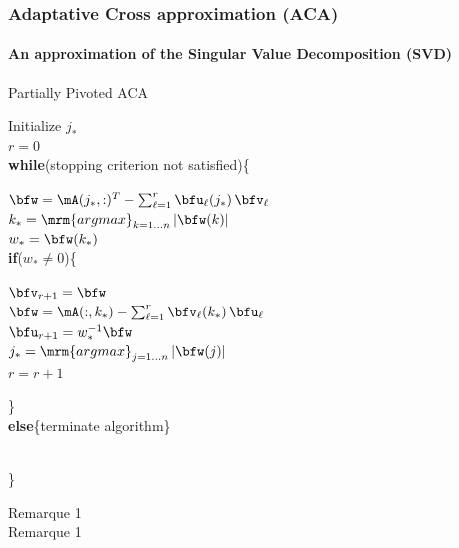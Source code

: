 
\begin{frame}
\frametitle{Adaptative Cross approximation (ACA)}
\framesubtitle{An approximation of the Singular Value Decomposition (SVD)} 

\begin{minipage}[t]{.6\linewidth}
\vspace{-0.9cm}
\begin{algorithm}[H]
  \caption{Partially Pivoted ACA}  
  Initialize $j_{*}$\\ $r=0$\\
  \textbf{while}(stopping criterion not satisfied)\{\\
  \indent\hspace{0.49cm} \parbox{\linewidth}{
    $\bfw = \mA(j_{*},:)^{T} - \sum_{\ell=1}^{r}\bfu_{\ell}(j_{*})\,\bfv_{\ell}$\\
    $k_{*} = \mathop{\mrm{argmax}}_{k = 1\dots n}\vert \bfw(k)\vert$\\
    $w_{*} = \bfw(k_{*})$\\
    \textbf{if}($w_{*}\neq 0$)\{\\
    \indent\hspace{0.5cm} \parbox{\linewidth}{
      $\bfv_{r+1} = \bfw$\\
      $\bfw = \mA(:,k_{*})-\sum_{\ell = 1}^{r}\bfv_{\ell}(k_{*})\,\bfu_{\ell} $\\
      $\bfu_{r+1} = w_{*}^{-1}\bfw$\\      
      $j_{*} = \mathop{\mrm{argmax}}_{j = 1\dots n} \vert \bfw(j)\vert$\\
      $r=r+1$} 
      \}\\
    \textbf{else}\{terminate algorithm\}
    }\\
  \}
\end{algorithm}
\end{minipage}
\hfill%
\begin{minipage}[t]{.3\linewidth}
Remarque 1\\
Remarque 1
\end{minipage}%

\end{frame}


